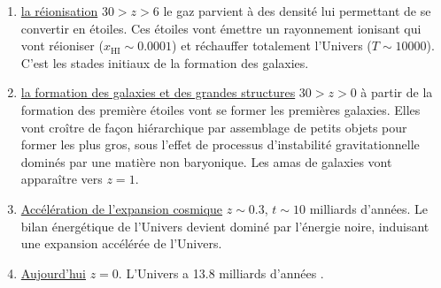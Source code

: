 \begin{enumerate}
\item \underline{la réionisation} $30>z>6$ le gaz parvient à des densité lui permettant de se convertir en étoiles. Ces étoiles vont émettre un rayonnement ionisant qui vont réioniser ($x_\mathrm{HI}\sim0.0001$) et réchauffer totalement l'Univers ($T\sim 10000$). C'est les stades initiaux de la formation des galaxies.
\item \underline{la formation des galaxies et des grandes structures} $30>z>0$ à partir de la formation des première étoiles vont se former les premières galaxies. Elles vont croître de façon hiérarchique  par assemblage de petits objets pour former les plus gros, sous l'effet de processus d'instabilité gravitationnelle dominés par une matière non baryonique. Les amas de galaxies vont apparaître vers $z=1$.
\item \underline{Accélération de l'expansion cosmique} $z\sim 0.3$, $t\sim 10$ milliards d'années. Le bilan énergétique de l'Univers devient dominé par l'énergie noire, induisant une expansion accélérée de l'Univers.
\item \underline{Aujourd'hui} $z=0$. L'Univers a 13.8 milliards d'années .
\end{enumerate}


